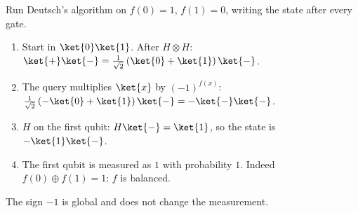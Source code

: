 \begin{exercisebox}
\begin{pproblem}[Deutsch on $f(x) = 1 - x$]\label{wp:deutsch}
    Run Deutsch's algorithm on $f(0) = 1$, $f(1) = 0$, writing the state after every gate.
\end{pproblem}
\tcblower
\begin{wsolution}
    \leavevmode
    \begin{enumerate}
        \item Start in $\ket{0}\ket{1}$. After $H \otimes H$:
              $\ket{+}\ket{-} = \frac{1}{\sqrt{2}}\left(\ket{0} + \ket{1}\right)\ket{-}$.
        \item The query multiplies $\ket{x}$ by $(-1)^{f(x)}$:
              $\frac{1}{\sqrt{2}}\left(-\ket{0} + \ket{1}\right)\ket{-} = -\ket{-}\ket{-}$.
        \item $H$ on the first qubit: $H\ket{-} = \ket{1}$, so the state is $-\ket{1}\ket{-}$.
        \item The first qubit is measured as $1$ with probability $1$. Indeed
              $f(0) \oplus f(1) = 1$: $f$ is balanced.
    \end{enumerate}
    The sign $-1$ is global and does not change the measurement.
\end{wsolution}
\end{exercisebox}
